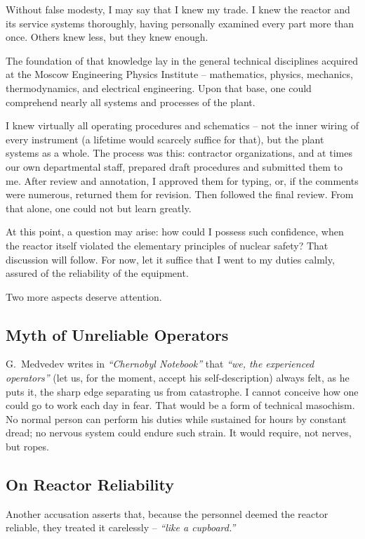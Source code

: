 \documentclass[openright]{bookest}
\begin{document}
Without false modesty, I may say that I knew my trade. I knew the reactor and its service systems thoroughly, having personally examined every part more than once. Others knew less, but they knew enough.

The foundation of that knowledge lay in the general technical disciplines acquired at the Moscow Engineering Physics Institute -- mathematics, physics, mechanics, thermodynamics, and electrical engineering. Upon that base, one could comprehend nearly all systems and processes of the plant.

I knew virtually all operating procedures and schematics -- not the inner wiring of every instrument (a lifetime would scarcely suffice for that), but the plant systems as a whole. The process was this: contractor organizations, and at times our own departmental staff, prepared draft procedures and submitted them to me. After review and annotation, I approved them for typing, or, if the comments were numerous, returned them for revision. Then followed the final review. From that alone, one could not but learn greatly.

At this point, a question may arise: how could I possess such confidence, when the reactor itself violated the elementary principles of nuclear safety? That discussion will follow. For now, let it suffice that I went to my duties calmly, assured of the reliability of the equipment.

Two more aspects deserve attention.

\subsection{Myth of Unreliable Operators}

G.~Medvedev writes in \textit{``Chernobyl Notebook''} that \textit{``we, the experienced operators''} (let us, for the moment, accept his self-description) always felt, as he puts it, the sharp edge separating us from catastrophe. I cannot conceive how one could go to work each day in fear. That would be a form of technical masochism. No normal person can perform his duties while sustained for hours by constant dread; no nervous system could endure such strain. It would require, not nerves, but ropes.

\subsection{On Reactor Reliability}

Another accusation asserts that, because the personnel deemed the reactor reliable, they treated it carelessly -- \textit{``like a cupboard.''}
\end{document}
